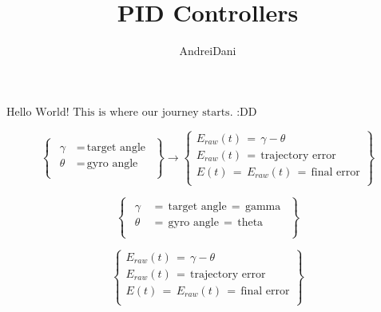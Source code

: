 \documentclass{article}
\title{PID Controllers}
\author{AndreiDani}
\begin{document}
    \maketitle %

    \(\text{Hello World! This is where our journey starts. :DD}\)

    \bigbreak %

    \begin{equation*}
        \left\{
            \begin{array}{l}
            \begin{aligned}
            \gamma\, &=\, \text{target angle} \\
            \theta\, &=\, \text{gyro angle} \\
            \end{aligned}
            \end{array}
        \right\}
        \longrightarrow
        \left\{
            \begin{array}{l}
            E_{raw}(t)\, =\, \gamma - \theta \\
            E_{raw}(t)\, =\, \text{trajectory error} \\
            E(t)\, =\, E_{raw}(t)\, =\, \text{final error} \\
            \end{array}
        \right\}
    \end{equation*}

    \[\left\{
        \begin{array}{l}
        \begin{aligned}
        \gamma\, &=\, \text{target angle}\, =\, \text{gamma} \\
        \theta\, &=\, \text{gyro angle}\, =\, \text{theta} \\
        \end{aligned}
        \end{array}
    \right\}\]

    \[\left\{
        \begin{array}{l}
        E_{raw}(t)\, =\, \gamma - \theta \\
        E_{raw}(t)\, =\, \text{trajectory error} \\
        E(t)\, =\, E_{raw}(t)\, =\, \text{final error} \\
        \end{array}
    \right\}\]
\end{document}
